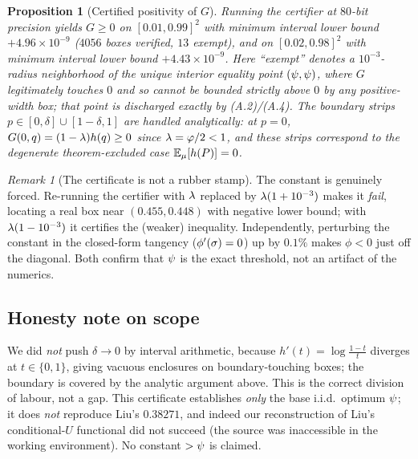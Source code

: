 \documentclass[11pt]{amsart}
\newtheorem{proposition}[theorem]{Proposition}
\theoremstyle{definition}
\theoremstyle{remark}
\newtheorem{remark}[theorem]{Remark}
\begin{document}
\begin{proposition}[Certified positivity of $G$]\label{prop:intcert}
Running the certifier at $80$-bit precision yields
$G\ge 0$ on $[0.01,0.99]^2$ with minimum interval lower bound
$+4.96\times10^{-9}$ ($4056$ boxes verified, $13$ exempt), and on
$[0.02,0.98]^2$ with minimum interval lower bound $+4.43\times 10^{-9}$.
Here ``exempt'' denotes a $10^{-3}$-radius neighborhood of the unique interior
equality point $(\psi,\psi)$, where $G$ legitimately touches $0$ and so cannot
be bounded strictly above $0$ by any positive-width box; that point is discharged
exactly by \textup{(A.2)/(A.4)}. The boundary strips $p\in[0,\delta]\cup[1-\delta,1]$
are handled analytically: at $p=0$, $G(0,q)=(1-\lambda)h(q)\ge 0$ since
$\lambda=\varphi/2<1$, and these strips correspond to the degenerate
theorem-excluded case $\mathbb{E}_\mu[h(P)]=0$.
\end{proposition}

\begin{remark}[The certificate is not a rubber stamp]\label{rmk:notrubber}
The constant is genuinely forced. Re-running the certifier with $\lambda$ replaced by
$\lambda(1+10^{-3})$ makes it \emph{fail}, locating a real box near $(0.455,0.448)$
with negative lower bound; with $\lambda(1-10^{-3})$ it certifies the (weaker)
inequality. Independently, perturbing the constant in the closed-form tangency
($\phi'(\sigma)=0$) up by $0.1\%$ makes $\phi<0$ just off the diagonal. Both confirm
that $\psi$ is the exact threshold, not an artifact of the numerics.
\end{remark}

\subsection{Honesty note on scope}
We did \emph{not} push $\delta\to 0$ by interval arithmetic, because
$h'(t)=\log\frac{1-t}{t}$ diverges at $t\in\{0,1\}$, giving vacuous enclosures on
boundary-touching boxes; the boundary is covered by the analytic argument above.
This is the correct division of labour, not a gap. This certificate establishes
\emph{only} the base i.i.d.\ optimum $\psi$; it does \emph{not} reproduce Liu's
$0.38271$, and indeed our reconstruction of Liu's conditional-$U$ functional did
not succeed (the source was inaccessible in the working environment). No constant
$>\psi$ is claimed.
\end{document}
